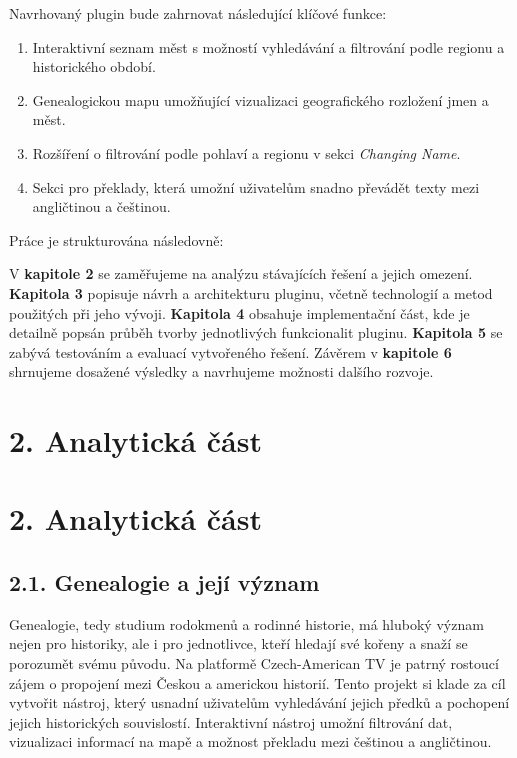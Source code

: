 \documentclass[12pt]{report}
\begin{document}
Navrhovaný plugin bude zahrnovat následující klíčové funkce:

\begin{enumerate}
    \item Interaktivní seznam měst s možností vyhledávání a filtrování podle regionu a historického období.
    \item Genealogickou mapu umožňující vizualizaci geografického rozložení jmen a měst.
    \item Rozšíření o filtrování podle pohlaví a regionu v sekci \textit{Changing Name}.
    \item Sekci pro překlady, která umožní uživatelům snadno převádět texty mezi angličtinou a češtinou.
\end{enumerate}

Práce je strukturována následovně:

V \textbf{kapitole 2} se zaměřujeme na analýzu stávajících řešení a jejich omezení. \textbf{Kapitola 3} popisuje návrh a architekturu pluginu, včetně technologií a metod použitých při jeho vývoji. \textbf{Kapitola 4} obsahuje implementační část, kde je detailně popsán průběh tvorby jednotlivých funkcionalit pluginu. \textbf{Kapitola 5} se zabývá testováním a evaluací vytvořeného řešení. Závěrem v \textbf{kapitole 6} shrnujeme dosažené výsledky a navrhujeme možnosti dalšího rozvoje.


\newpage
\section{2. Analytická část}
\vspace{1.cm}
\section{2. Analytická část}
\vspace{1.cm}
\subsection{2.1. Genealogie a její význam}
Genealogie, tedy studium rodokmenů a rodinné historie, má hluboký význam nejen pro historiky, ale i pro jednotlivce, kteří hledají své kořeny a snaží se porozumět svému původu. Na platformě Czech-American TV je patrný rostoucí zájem o propojení mezi Českou a americkou historií. Tento projekt si klade za cíl vytvořit nástroj, který usnadní uživatelům vyhledávání jejich předků a pochopení jejich historických souvislostí. Interaktivní nástroj umožní filtrování dat, vizualizaci informací na mapě a možnost překladu mezi češtinou a angličtinou.
\end{document}
